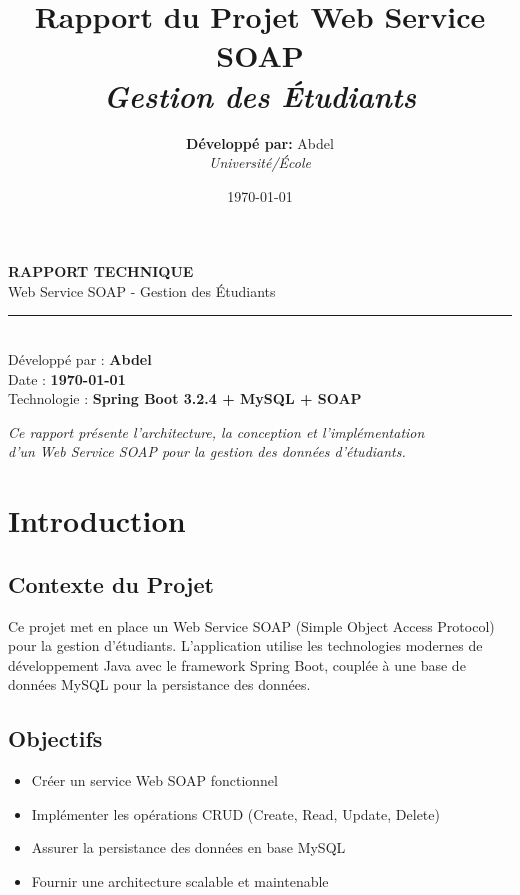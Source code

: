 \documentclass[12pt,a4paper]{report}
\title{\textbf{Rapport du Projet Web Service SOAP} \\ \textit{Gestion des Étudiants}}
\author{\textbf{Développé par:} Abdel \\ \textit{Université/École}}
\date{\today}
\begin{document}
\begin{titlepage}
\centering
\vspace*{\fill}

{\LARGE\textbf{RAPPORT TECHNIQUE}}\\[0.5cm]
{\Large Web Service SOAP - Gestion des Étudiants}\\[1cm]

\rule{\linewidth}{2pt}\\[1cm]

{\large Développé par : \textbf{Abdel}}\\[0.5cm]
{\large Date : \textbf{\today}}\\[0.5cm]
{\large Technologie : \textbf{Spring Boot 3.2.4 + MySQL + SOAP}}\\[2cm]

\vspace*{\fill}

{\large \textit{Ce rapport présente l'architecture, la conception et l'implémentation} \\ 
\textit{d'un Web Service SOAP pour la gestion des données d'étudiants.}}

\end{titlepage}

\newpage
\tableofcontents
\newpage

\chapter{Introduction}

\section{Contexte du Projet}
Ce projet met en place un Web Service SOAP (Simple Object Access Protocol) pour la gestion d'étudiants. L'application utilise les technologies modernes de développement Java avec le framework Spring Boot, couplée à une base de données MySQL pour la persistance des données.

\section{Objectifs}
\begin{itemize}
    \item Créer un service Web SOAP fonctionnel
    \item Implémenter les opérations CRUD (Create, Read, Update, Delete)
    \item Assurer la persistance des données en base MySQL
    \item Fournir une architecture scalable et maintenable
\end{itemize}
\end{document}
